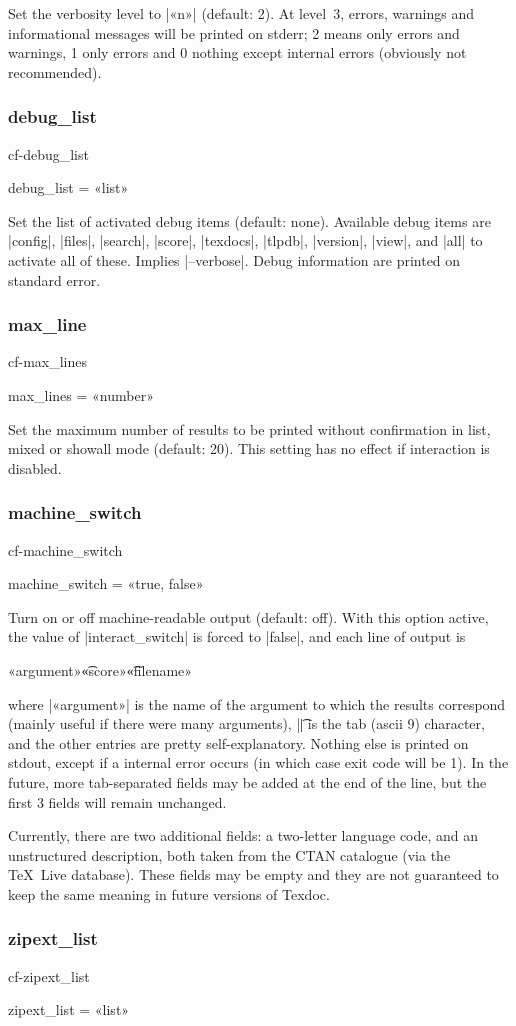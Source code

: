 \documentclass[a4paper, oneside]{scrartcl}
\makeatletter
\newcommand\texlive{\TeX~Live\xspace}
\newif\ifframed
\newenvironment{cmdsubsub}[2]{%
  \framedfalse \commandes\subsubsection{#1}{#2}%
  }{%
  \endcommandes}
\newenvironment{htcode}{%
  \SaveVerbatim[samepage, gobble=2]{verbmat}%
  }{%
  \endSaveVerbatim
  \par\medskip\noindent\hspace*{\parindent}%
  \BUseVerbatim{verbmat}%
  \par\medskip\@endpetrue}
\makeatother
\begin{document}
Set the verbosity level to |«n»| (default: 2). At level~3, errors, warnings and
informational messages will be printed on stderr; 2 means only errors and
warnings, 1 only errors and 0 nothing except internal errors (obviously not
recommended).

\begin{cmdsubsub}{debug_list}{cf-debug_list}
  debug_list = «list»
\end{cmdsubsub}

Set the list of activated debug items (default: none). Available debug items
are |config|, |files|, |search|, |score|, |texdocs|, |tlpdb|, |version|,
|view|, and |all| to activate all of these. Implies |--verbose|. Debug
information are printed on standard error.

\begin{cmdsubsub}{max_line}{cf-max_lines}
  max_lines = «number»
\end{cmdsubsub}

Set the maximum number of results to be printed without confirmation in list,
mixed or showall mode (default: 20). This setting has no effect if interaction
is disabled.

\begin{cmdsubsub}{machine_switch}{cf-machine_switch}
  machine_switch = «true, false»
\end{cmdsubsub}

Turn on or off machine-readable output (default: off).  With this option
active, the value of |interact_switch| is forced to |false|, and each line of
output is
\begin{htcode}
  «argument»\t«score»\t«filename»
\end{htcode}
where |«argument»| is the name of the argument to which the results correspond
(mainly useful if there were many arguments), |\t| is the tab (ascii 9)
character, and the other entries are pretty self-explanatory. Nothing else is
printed on stdout, except if a internal error occurs (in which case exit code
will be 1). In the future, more tab-separated fields may be added at the end
of the line, but the first 3 fields will remain unchanged.

Currently, there are two additional fields: a two-letter language code, and an
unstructured description, both taken from the CTAN catalogue (via the \texlive
database). These fields may be empty and they are not guaranteed to keep the
same meaning in future versions of Texdoc.

\begin{cmdsubsub}{zipext_list}{cf-zipext_list}
  zipext_list = «list»
\end{cmdsubsub}
\end{document}
